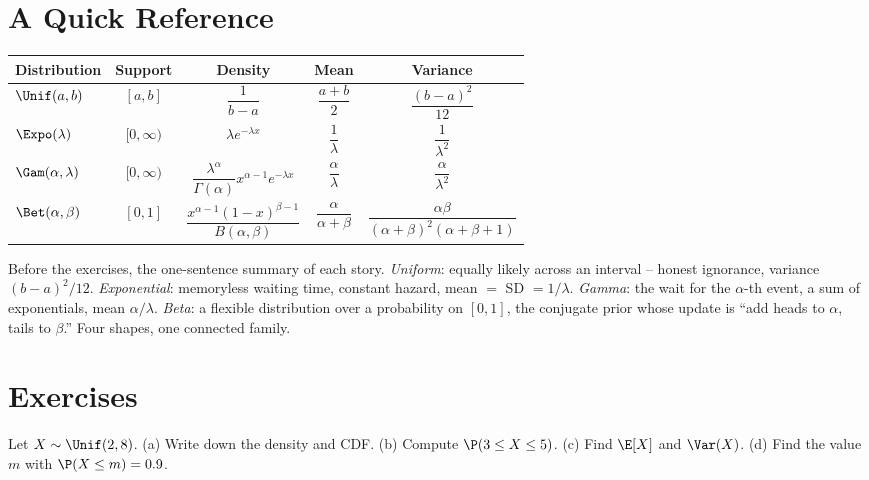 \section{A Quick Reference}
\label{ch11:reference}

\begin{center}
\renewcommand{\arraystretch}{1.5}
\begin{tabular}{@{}lcccc@{}}
\toprule
Distribution & Support & Density & Mean & Variance \\
\midrule
$\Unif(a,b)$ & $[a,b]$ & $\dfrac{1}{b-a}$ & $\dfrac{a+b}{2}$ & $\dfrac{(b-a)^2}{12}$ \\
$\Expo(\lambda)$ & $[0,\infty)$ & $\lambda e^{-\lambda x}$ & $\dfrac{1}{\lambda}$ & $\dfrac{1}{\lambda^2}$ \\
$\Gam(\alpha,\lambda)$ & $[0,\infty)$ & $\dfrac{\lambda^\alpha}{\Gamma(\alpha)}x^{\alpha-1}e^{-\lambda x}$ & $\dfrac{\alpha}{\lambda}$ & $\dfrac{\alpha}{\lambda^2}$ \\
$\Bet(\alpha,\beta)$ & $[0,1]$ & $\dfrac{x^{\alpha-1}(1-x)^{\beta-1}}{B(\alpha,\beta)}$ & $\dfrac{\alpha}{\alpha+\beta}$ & $\dfrac{\alpha\beta}{(\alpha+\beta)^2(\alpha+\beta+1)}$ \\
\bottomrule
\end{tabular}
\end{center}

\begin{recoverybox}
Before the exercises, the one-sentence summary of each story. \emph{Uniform}:
equally likely across an interval -- honest ignorance, variance $(b-a)^2/12$.
\emph{Exponential}: memoryless waiting time, constant hazard, mean $=$ SD $=
1/\lambda$. \emph{Gamma}: the wait for the $\alpha$-th event, a sum of
exponentials, mean $\alpha/\lambda$. \emph{Beta}: a flexible distribution over a
probability on $[0,1]$, the conjugate prior whose update is ``add heads to
$\alpha$, tails to $\beta$.'' Four shapes, one connected family.
\end{recoverybox}

\section{Exercises}
\label{ch11:exercises}

\begin{exercise}
\label{ch11:exr-unif}
Let $X\sim\Unif(2,8)$. (a) Write down the density and CDF. (b) Compute
$\P(3 \le X \le 5)$. (c) Find $\E[X]$ and $\Var(X)$. (d) Find the value $m$ with
$\P(X \le m) = 0.9$.
\end{exercise}


